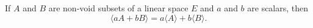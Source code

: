 If $A$ and $B$ are non-void subsets of a linear space $E$ and $a$ and $b$ are scalars, then
$$
\langle aA + bB \rangle = a \langle A \rangle + b \langle B \rangle.
$$
